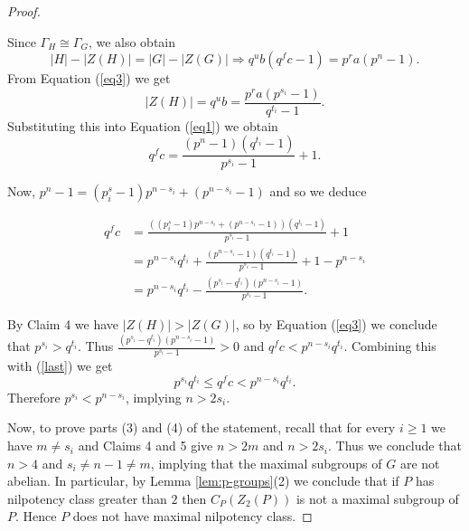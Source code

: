 \documentclass[12pt]{amsart}
\theoremstyle{definition}
\theoremstyle{remark}
\theoremstyle{plain}
\theoremstyle{plain}
\theoremstyle{plain}
\theoremstyle{plain}
\theoremstyle{plain}
\theoremstyle{remark}
\theoremstyle{remark}
\theoremstyle{definition}
\begin{document}
\begin{proof}
\begin{description}
Since $\Gamma_H \cong \Gamma_G$, we also obtain
\begin{equation}\label{eq1} |H| - |Z(H)| = |G| - |Z(G)| \Longrightarrow 
q^{u}b(q^fc - 1) = p^{r}a(p^{n} - 1). \end{equation}
From Equation (\ref{eq3}) we get
\[ |Z(H)| = q^ub = \frac{p^{r}a(p^{s_i}- 1)}{q^{t_i} - 1}.\]
Substituting this into Equation (\ref{eq1}) we obtain
\[ q^fc = \frac{(p^{n}- 1)(q^{t_i} - 1)}{p^{s_i}- 1} + 1. \]

Now, $p^n - 1 = (p^s_i - 1)p^{n-s_i} +(p^{n-s_i} - 1)$ and so we deduce  

\[\begin{aligned} q^fc &= \frac{((p^s_i - 1)p^{n-s_i} +(p^{n-s_i} - 1))(q^{t_i} - 1)}{p^{s_i}- 1} + 1 
\\ &= p^{n-s_i}q^{t_i}  + \frac{(p^{n-s_i} - 1)(q^{t_i} - 1)}{p^{s_i}- 1} + 1 - p^{n-s_i}
\\ &= p^{n-s_i}q^{t_i} - \frac{(p^{s_i}-q^{t_i})(p^{n-s_i}-1)}{p^{s_i} -1}.
\end{aligned} \]



By Claim 4 we have $|Z(H)| > |Z(G)|$, so by Equation (\ref{eq3}) we conclude that $p^{s_i} > q^{t_i}$. Thus $\frac{(p^{s_i}-q^{t_i})(p^{n-s_i}-1)}{p^{s_i} -1} > 0$ and $q^fc < p^{n-s_i}q^{t_i}$. Combining this with (\ref{last}) we get
\[ p^{s_i}q^{t_i} \leq  q^fc < p^{n-s_i}q^{t_i}.\]
Therefore $p^{s_i} < p^{n-s_i}$, implying $n > 2s_i$.
\end{description}

Now, to prove parts (3) and (4) of the statement, recall that for every $i\geq 1$ we have $m \neq s_i$ and Claims 4 and 5 give $n > 2m$ and $n > 2s_i$. Thus we conclude that $n >4$ and $s_i \neq n-1 \neq m$, implying that the maximal subgroups of $G$ are not abelian. In particular, by Lemma \ref{lem:p-groups}(2) we conclude that if $P$ has nilpotency class greater than $2$ then $C_P(Z_2(P))$ is not a maximal subgroup of $P$. Hence $P$ does not have maximal nilpotency class.




\end{proof}
\end{document}
